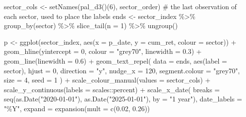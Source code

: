 \documentclass[
  12pt,
  a4paper,
]{scrbook}
\newenvironment{Shaded}{\begin{snugshade}}{\end{snugshade}}
\newcommand{\AttributeTok}[1]{\textcolor[rgb]{0.40,0.45,0.13}{#1}}
\newcommand{\CommentTok}[1]{\textcolor[rgb]{0.37,0.37,0.37}{#1}}
\newcommand{\DecValTok}[1]{\textcolor[rgb]{0.68,0.00,0.00}{#1}}
\newcommand{\FloatTok}[1]{\textcolor[rgb]{0.68,0.00,0.00}{#1}}
\newcommand{\FunctionTok}[1]{\textcolor[rgb]{0.28,0.35,0.67}{#1}}
\newcommand{\NormalTok}[1]{\textcolor[rgb]{0.00,0.23,0.31}{#1}}
\newcommand{\OtherTok}[1]{\textcolor[rgb]{0.00,0.23,0.31}{#1}}
\newcommand{\SpecialCharTok}[1]{\textcolor[rgb]{0.37,0.37,0.37}{#1}}
\newcommand{\StringTok}[1]{\textcolor[rgb]{0.13,0.47,0.30}{#1}}
\theoremstyle{plain}
\theoremstyle{definition}
\theoremstyle{remark}
\begin{document}
\begin{Shaded}
\begin{Highlighting}[]
\NormalTok{sector\_cols }\OtherTok{\textless{}{-}} \FunctionTok{setNames}\NormalTok{(}\FunctionTok{pal\_d3}\NormalTok{()(}\DecValTok{6}\NormalTok{), sector\_order)}
\CommentTok{\# the last observation of each sector, used to place the labels}
\NormalTok{ends }\OtherTok{\textless{}{-}}\NormalTok{ sector\_index }\SpecialCharTok{\%\textgreater{}\%} \FunctionTok{group\_by}\NormalTok{(sector) }\SpecialCharTok{\%\textgreater{}\%} \FunctionTok{slice\_tail}\NormalTok{(}\AttributeTok{n =} \DecValTok{1}\NormalTok{) }\SpecialCharTok{\%\textgreater{}\%} \FunctionTok{ungroup}\NormalTok{()}

\NormalTok{p }\OtherTok{\textless{}{-}} \FunctionTok{ggplot}\NormalTok{(sector\_index, }\FunctionTok{aes}\NormalTok{(}\AttributeTok{x =}\NormalTok{ p\_date, }\AttributeTok{y =}\NormalTok{ cum\_ret, }\AttributeTok{colour =}\NormalTok{ sector)) }\SpecialCharTok{+}
     \FunctionTok{geom\_hline}\NormalTok{(}\AttributeTok{yintercept =} \DecValTok{0}\NormalTok{, }\AttributeTok{colour =} \StringTok{"grey70"}\NormalTok{, }\AttributeTok{linewidth =} \FloatTok{0.3}\NormalTok{) }\SpecialCharTok{+}
     \FunctionTok{geom\_line}\NormalTok{(}\AttributeTok{linewidth =} \FloatTok{0.6}\NormalTok{) }\SpecialCharTok{+}
     \FunctionTok{geom\_text\_repel}\NormalTok{(}
          \AttributeTok{data =}\NormalTok{ ends, }\FunctionTok{aes}\NormalTok{(}\AttributeTok{label =}\NormalTok{ sector), }\AttributeTok{hjust =} \DecValTok{0}\NormalTok{, }\AttributeTok{direction =} \StringTok{"y"}\NormalTok{,}
          \AttributeTok{nudge\_x =} \DecValTok{120}\NormalTok{, }\AttributeTok{segment.colour =} \StringTok{"grey70"}\NormalTok{, }\AttributeTok{size =} \DecValTok{4}\NormalTok{, }\AttributeTok{seed =} \DecValTok{1}
\NormalTok{     ) }\SpecialCharTok{+}
     \FunctionTok{scale\_colour\_manual}\NormalTok{(}\AttributeTok{values =}\NormalTok{ sector\_cols) }\SpecialCharTok{+}
     \FunctionTok{scale\_y\_continuous}\NormalTok{(}\AttributeTok{labels =}\NormalTok{ scales}\SpecialCharTok{::}\NormalTok{percent) }\SpecialCharTok{+}
     \FunctionTok{scale\_x\_date}\NormalTok{(}
          \AttributeTok{breaks =} \FunctionTok{seq}\NormalTok{(}\FunctionTok{as.Date}\NormalTok{(}\StringTok{"2020{-}01{-}01"}\NormalTok{), }\FunctionTok{as.Date}\NormalTok{(}\StringTok{"2025{-}01{-}01"}\NormalTok{), }\AttributeTok{by =} \StringTok{"1 year"}\NormalTok{),}
          \AttributeTok{date\_labels =} \StringTok{"\%Y"}\NormalTok{, }\AttributeTok{expand =} \FunctionTok{expansion}\NormalTok{(}\AttributeTok{mult =} \FunctionTok{c}\NormalTok{(}\FloatTok{0.02}\NormalTok{, }\FloatTok{0.26}\NormalTok{))}

\end{Highlighting}
\end{Shaded}
\end{document}
